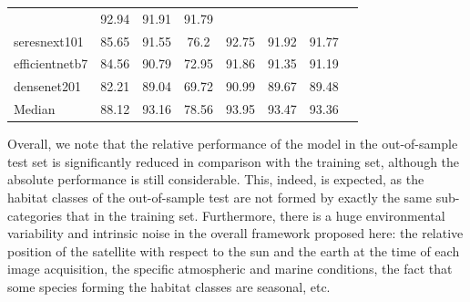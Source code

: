 \begin{table}[H]
\begin{tabular}{lccccccc}
                                & 92.94          & 91.91          & 91.79
        \\
        seresnext101            & 85.65          & 91.55          & 76.2
                                & 92.75          & 91.92          & 91.77
        \\
        efficientnetb7          & 84.56          & 90.79          & 72.95
                                & 91.86          & 91.35          & 91.19
        \\
        densenet201             & 82.21          & 89.04          & 69.72
                                & 90.99          & 89.67          & 89.48
        \\
        \hdashline
        Median                  & 88.12          & 93.16          & 78.56
                                & 93.95          & 93.47          & 93.36
        \\
        \bottomrule
    \end{tabular}
\end{table}

Overall, we note that the relative performance of the model in the
out-of-sample test set is significantly reduced in comparison with the training
set, although the absolute performance is still considerable. This, indeed, is
expected, as the habitat classes of the out-of-sample test are not formed by
exactly the same sub-categories that in the training set. Furthermore, there is
a huge environmental variability and intrinsic noise in the overall framework
proposed here: the relative position of the satellite with respect to the sun
and the earth at the time of each image acquisition, the specific atmospheric
and marine conditions, the fact that some species forming the habitat classes
are seasonal, etc.

